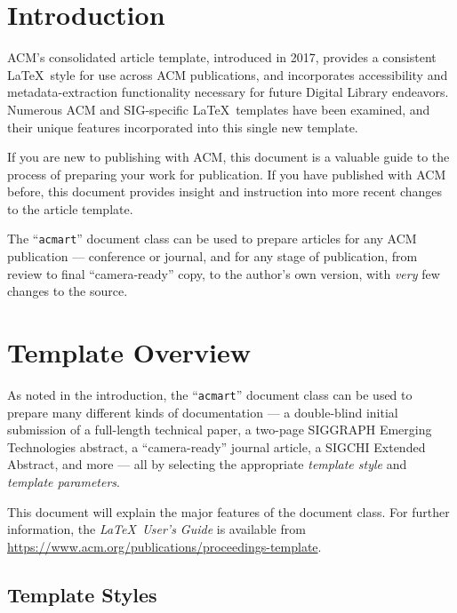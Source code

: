 \documentclass[manuscript,screen,review]{acmart}
\begin{document}
\maketitle

\section{Introduction}
ACM's consolidated article template, introduced in 2017, provides a
consistent \LaTeX\ style for use across ACM publications, and
incorporates accessibility and metadata-extraction functionality
necessary for future Digital Library endeavors. Numerous ACM and
SIG-specific \LaTeX\ templates have been examined, and their unique
features incorporated into this single new template.

If you are new to publishing with ACM, this document is a valuable
guide to the process of preparing your work for publication. If you
have published with ACM before, this document provides insight and
instruction into more recent changes to the article template.

The ``\verb|acmart|'' document class can be used to prepare articles
for any ACM publication --- conference or journal, and for any stage
of publication, from review to final ``camera-ready'' copy, to the
author's own version, with {\itshape very} few changes to the source.

\section{Template Overview}
As noted in the introduction, the ``\verb|acmart|'' document class can
be used to prepare many different kinds of documentation --- a
double-blind initial submission of a full-length technical paper, a
two-page SIGGRAPH Emerging Technologies abstract, a ``camera-ready''
journal article, a SIGCHI Extended Abstract, and more --- all by
selecting the appropriate {\itshape template style} and {\itshape
  template parameters}.

This document will explain the major features of the document
class. For further information, the {\itshape \LaTeX\ User's Guide} is
available from
\url{https://www.acm.org/publications/proceedings-template}.

\subsection{Template Styles}
\end{document}
